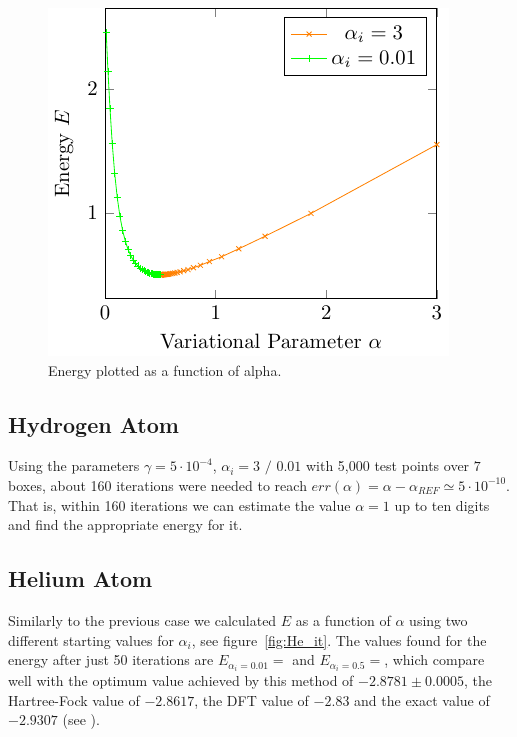 \begin{figure}
	\begin{center}
		\includegraphics[scale=0.9]{graphs/ho-e-alpha.pdf}
		\caption{
			Energy plotted as a function of alpha. %
		}
		\label{fig:Ho_rel}
	\end{center}
\end{figure}


\subsection{Hydrogen Atom}
Using the parameters
$\gamma = 5\cdot 10^{-4}$, $\alpha_i = 3 \text{~/~}0.01$ with 5,000
test points over $7$ boxes, about 160 iterations were needed to reach
$err(\alpha) = \alpha-\alpha_{REF} \simeq 5 \cdot 10^{-10}$. That is, within 160
iterations we can estimate the value $\alpha=1$ up to ten digits and find the appropriate energy for it.


\subsection{Helium Atom}

Similarly to the previous case we calculated $E$ as a function of $\alpha$
using two different starting values for $\alpha_i$, see figure~\ref{fig:He_it}.
The values found for the energy after just 50 iterations are
$E_{\alpha_i = 0.01} =  $ and $E_{\alpha_i = 0.5} =  $, which
compare well with the optimum value achieved by this method
of $-2.8781 \pm 0.0005$, the Hartree-Fock value of $-2.8617$,
the DFT value of $-2.83$ and the exact value of $-2.9307$ (see \cite{JosBook}). %

